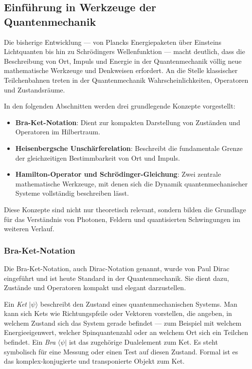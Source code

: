 \subsection{Einführung in Werkzeuge der Quantenmechanik\label{fourier:subsection:werkzeugeQuantenmechanik}}
	Die bisherige Entwicklung --- von Plancks Energiepaketen über Einsteins Lichtquanten bis hin zu Schrödingers Wellenfunktion ---
	macht deutlich, dass die Beschreibung von Ort, Impuls und Energie in der Quantenmechanik völlig neue mathematische Werkzeuge und Denkweisen erfordert.
	An die Stelle klassischer Teilchenbahnen treten in der Quantenmechanik Wahrscheinlichkeiten, Operatoren und Zustandsräume.

	In den folgenden Abschnitten werden drei grundlegende Konzepte vorgestellt:
	\begin{itemize}
	\item \textbf{Bra-Ket-Notation}:
	Dient zur kompakten Darstellung von Zuständen und Operatoren im Hilbertraum.

	\item \textbf{Heisenbergsche Unschärferelation}:
	Beschreibt die fundamentale Grenze der gleichzeitigen Bestimmbarkeit von Ort und Impuls.

	\item \textbf{Hamilton-Operator und Schrödinger-Gleichung}:
	Zwei zentrale mathematische Werkzeuge, mit denen sich die Dynamik quantenmechanischer Systeme vollständig beschreiben lässt.
	\end{itemize}

	Diese Konzepte sind nicht nur theoretisch relevant, sondern bilden die Grundlage für das Verständnis von Photonen, Feldern und quantisierten Schwingungen im weiteren Verlauf.

	\subsubsection{Bra-Ket-Notation\label{fourier:subsubsection:braKetNotation}}
		Die Bra-Ket-Notation, auch Dirac-Notation genannt, wurde von Paul Dirac eingeführt und ist heute Standard in der Quantenmechanik.
		Sie dient dazu, Zustände und Operatoren kompakt und elegant darzustellen.

		Ein \emph{Ket} $|\psi\rangle$ beschreibt den Zustand eines quantenmechanischen Systems.
		Man kann sich Kets wie Richtungspfeile oder Vektoren vorstellen, die angeben, in welchem Zustand sich das System gerade befindet ---
		zum Beispiel mit welchem Energieeigenwert, welcher Spinquantenzahl oder an welchem Ort sich ein Teilchen befindet.	Ein \emph{Bra} $\langle\psi|$ ist das zugehörige Dualelement zum Ket.
		Es steht symbolisch für eine Messung oder einen Test auf diesen Zustand.
		Formal ist es das komplex-konjugierte und transponierte Objekt zum Ket.

